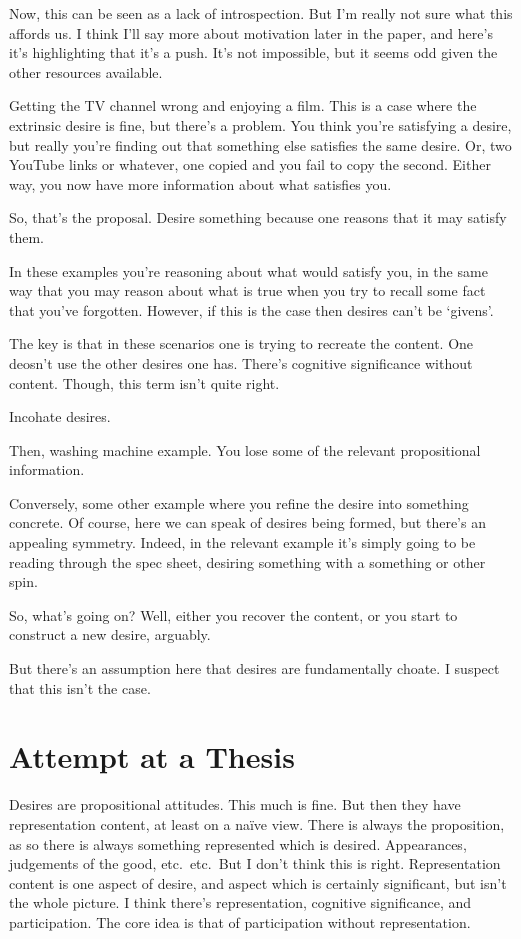 \documentclass[10pt]{article}
\begin{document}
Now, this can be seen as a lack of introspection.
But I'm really not sure what this affords us.
I think I'll say more about motivation later in the paper, and here's it's highlighting that it's a push.
It's not impossible, but it seems odd given the other resources available.


Getting the TV channel wrong and enjoying a film.
This is a case where the extrinsic desire is fine, but there's a problem.
You think you're satisfying a desire, but really you're finding out that something else satisfies the same desire.
Or, two YouTube links or whatever, one copied and you fail to copy the second.
Either way, you now have more information about what satisfies you.

So, that's the proposal.
Desire something because one reasons that it may satisfy them.

In these examples you're reasoning about what would satisfy you, in the same way that you may reason about what is true when you try to recall some fact that you've forgotten.
However, if this is the case then desires can't be `givens'.

The key is that in these scenarios one is trying to recreate the content.
One deosn't use the other desires one has.
There's cognitive significance without content.
Though, this term isn't quite right.

Incohate desires.

Then, washing machine example.
You lose some of the relevant propositional information.

Conversely, some other example where you refine the desire into something concrete.
Of course, here we can speak of desires being formed, but there's an appealing symmetry.
Indeed, in the relevant example it's simply going to be reading through the spec sheet, desiring something with a something or other spin.


So, what's going on?
Well, either you recover the content, or you start to construct a new desire, arguably.

But there's an assumption here that desires are fundamentally choate.
I suspect that this isn't the case.






\section{Attempt at a Thesis}
\label{sec:attempt-at-thesis}

Desires are propositional attitudes.
This much is fine.
But then they have representation content, at least on a na\"{i}ve view.
There is always the proposition, as so there is always something represented which is desired.
Appearances, judgements of the good, etc.\ etc.\
But I don't think this is right.
Representation content is one aspect of desire, and aspect which is certainly significant, but isn't the whole picture.
I think there's representation, cognitive significance, and participation.
The core idea is that of participation without representation.
\end{document}
